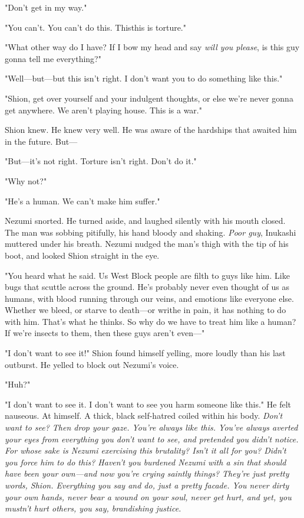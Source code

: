 "Don't get in my way."

"You can't. You can't do this. This\el this is torture."

"What other way do I have? If I bow my head and say \emph{will you please}, is
this guy gonna tell me everything?"

"Well---but---but this isn't right. I don't want you to do something like
this."

"Shion, get over yourself and your indulgent thoughts, or else we're
never gonna get anywhere. We aren't playing house. This is a war."

Shion knew. He knew very well. He was aware of the hardships that
awaited him in the future. But---

"But---it's not right. Torture isn't right. Don't do it."

"Why not?"

"He's a human. We can't make him suffer."

Nezumi snorted. He turned aside, and laughed silently with his mouth
closed. The man was sobbing pitifully, his hand bloody and shaking. \emph{Poor
guy}, Inukashi muttered under his breath. Nezumi nudged the man's thigh
with the tip of his boot, and looked Shion straight in the eye.

"You heard what he said. Us West Block people are filth to guys like
him. Like bugs that scuttle across the ground. He's probably never even
thought of us as humans, with blood running through our veins, and
emotions like everyone else. Whether we bleed, or starve to death---or
writhe in pain, it has nothing to do with him. That's what he thinks. So
why do we have to treat him like a human? If we're insects to them, then
these guys aren't even---"

"I don't want to see it!" Shion found himself yelling, more loudly than
his last outburst. He yelled to block out Nezumi's voice.

"Huh?"

"I don't want to see it. I don't want to see you harm someone like
this." He felt nauseous. At himself. A thick, black self-hatred coiled
within his body. \emph{Don't want to see? Then drop your gaze. You're always
like this. You've always averted your eyes from everything you don't
want to see, and pretended you didn't notice. For whose sake is Nezumi
exercising this brutality? Isn't it all for you? Didn't you force him to
do this? Haven't you burdened Nezumi with a sin that should have been
your own---and now you're crying saintly things? They're just pretty
words, Shion. Everything you say and do, just a pretty facade. You never
dirty your own hands, never bear a wound on your soul, never get hurt,
and yet, \emph{you mustn't hurt others,} you say, brandishing justice.}

